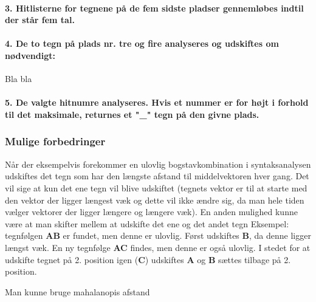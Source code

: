 \paragraph{3. Hitlisterne for tegnene på de fem sidste pladser gennemløbes indtil der står fem tal.}
\paragraph{4. De to tegn på plads nr. tre og fire analyseres og udskiftes om nødvendigt:}

Bla bla

\paragraph{5. De valgte hitnumre analyseres. Hvis et nummer er for højt i forhold til det maksimale, returnes et "\_" tegn på den givne plads.}

\subsubsection{Mulige forbedringer}
Når der eksempelvis forekommer en ulovlig bogstavkombination i syntaksanalysen udskiftes det tegn som har den længste afstand til middelvektoren hver gang. Det vil sige at kun det ene tegn vil blive udskiftet (tegnets vektor er til at starte med den vektor der ligger længest væk og dette vil ikke ændre sig, da man hele tiden vælger vektorer der ligger længere og længere væk). En anden mulighed kunne være at man skifter mellem at udskifte det ene og det andet tegn Eksempel: tegnfølgen \textbf{AB} er fundet, men denne er ulovlig. Først udskiftes \textbf{B}, da denne ligger længst væk. En ny tegnfølge \textbf{AC} findes, men denne er også ulovlig. I stedet for at udskifte tegnet på 2. position igen (\textbf{C}) udskiftes \textbf{A} og \textbf{B} sættes tilbage på 2. position.

Man kunne bruge mahalanopis afstand